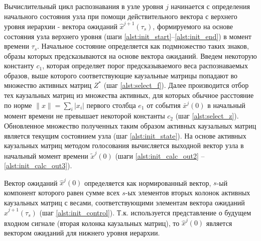 \documentclass[12pt]{scrartcl}
\begin{document}
	\linespread{1}
	\begin{algorithm}[H]
		\label{alg:automato}
		\begin{algorithmic}[1]
			
		\end{algorithmic}
	\end{algorithm}
	\linespread{2}
	
	Вычислительный цикл распознавания в узле уровня $j$ начинается с определения начального состояния узла при помощи действительного вектора с верхнего уровня иерархии - вектора ожиданий $\hat x^{j+1}(\tau_s)$, формируемого на основе состояния узла верхнего уровня (шаги \ref{alst:init_start}--\ref{alst:init_end}) в момент времени $\tau_s$. Начальное состояние определяется как подмножество таких знаков, образы которых предсказываются на основе вектора ожиданий. Введем некоторую константу $c_1$, которая определяет порог предсказываемого веса распознаваемых образов, выше которого соответствующие каузальные матрицы попадают во множество активных матриц $Z^*$ (шаг \ref{alst:select_f}). Далее производится отбор тех каузальных матриц из множества активных, для которых обычное расстояние по норме $\|x\|=\sum_i |x_i|$ первого столбца $e_1$ от события $\bar x^j(0)$ в начальный момент времени не превышает некоторой константы $c_2$ (шаг \ref{alst:select_z}). Обновленное множество полученных таким образом активных каузальных матриц является текущим состоянием узла (шаг \ref{alst:init_state}). На основе активных каузальных матриц методом голосования вычисляется выходной вектор узла  в начальный момент времени $\tilde x^j(0)$ (шаги \ref{alst:init_calc_out2} -- \ref{alst:init_calc_out3}).

	Вектор ожиданий $\hat x^j(0)$ определяется как нормированный вектор, $s$-ый компонент которого равен сумме всех $s$-ых элементов вторых колонок активных каузальных матриц с весами, соответствующими элементам вектора ожиданий $\hat x^{j+1}(\tau_s)$ (шаг \ref{alst:init_control}). Т.к. используется представление о будущем входном сигнале (вторая колонка каузальных матриц), то $\hat x^j(0)$ является вектором ожиданий для нижнего уровня иерархии.

	\linespread{1}
	\begin{algorithm}[H]
		\begin{algorithmic}[1]
			\algrestore{algst:store1}
			
		\end{algorithmic}
	\end{algorithm}
	\linespread{2}
		
\end{document}
